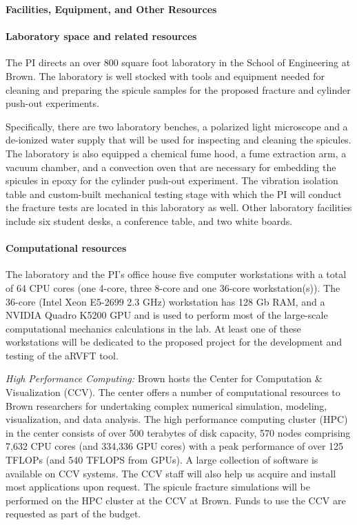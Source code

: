 \documentclass[10pt,letterpaper]{article}
\begin{document}
\begin{center}\textbf{\large{Facilities, Equipment, and Other Resources}}\end{center}

\paragraph{Laboratory space and related resources}
The PI directs an over 800 square foot laboratory in the School of Engineering at Brown. The laboratory is well stocked with  tools and equipment needed for cleaning and preparing the spicule samples for the proposed fracture and cylinder push-out experiments.

Specifically, there are two laboratory benches, a polarized light microscope and a de-ionized water supply that will be used for inspecting and cleaning the spicules. The laboratory is also equipped a chemical fume hood, a fume extraction arm, a vacuum chamber, and a convection oven that are necessary for embedding the spicules in epoxy for the cylinder push-out experiment.
%
The vibration isolation table and custom-built mechanical testing stage with which the PI will conduct the fracture tests are located in this laboratory as well.
%
Other laboratory facilities include six student desks, a conference table, and two white boards.

\paragraph{Computational resources}
The laboratory and the PI's office house five computer workstations with a total of 64 CPU cores (one 4-core, three 8-core and one 36-core workstation(s)). The 36-core (Intel Xeon E5-2699 2.3 GHz) workstation has 128 Gb RAM, and a NVIDIA Quadro K5200 GPU and is used to perform most of the large-scale computational mechanics calculations in the lab. At least one of these workstations will be dedicated to the proposed project for the development and testing of the aRVFT tool.

\textit{High Performance Computing:}
Brown hosts the Center for Computation \& Visualization (CCV). The center offers a number of computational resources to Brown researchers for undertaking complex numerical simulation, modeling,  visualization, and data analysis.
The high performance computing cluster (HPC) in the center  consists of over 500 terabytes of disk capacity, 570 nodes comprising 7,632 CPU cores (and 334,336 GPU cores) with a peak performance of over 125 TFLOPs (and 540 TFLOPS from GPUs). A large collection of software is available on CCV systems. The CCV staff will also help us acquire and install most applications upon request.
%
The spicule fracture simulations will be performed on the HPC cluster at the CCV at Brown. Funds to use the CCV are requested as part of the budget.   
\end{document}
